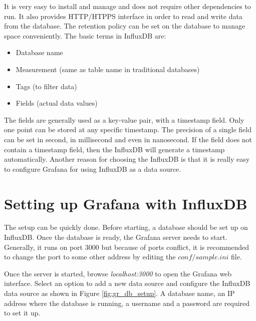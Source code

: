 It is very easy to install and manage and does not require other dependencies to run. It also provides HTTP/HTPPS interface in order to read and write data from the database. The retention policy can be set on the database to manage space conveniently. The basic terms in InfluxDB are:

\begin{itemize}
	\item Database name
	\item Measurement (same as table name in traditional databases)
	\item Tags (to filter data)
	\item Fields (actual data values)
\end{itemize}

The fields are generally used as a key-value pair, with a timestamp field. Only one point can be stored at any specific timestamp. The precision of a single field can be set in second, in millisecond and even in nanosecond. If the field does not contain a timestamp field, then the InfluxDB will generate a timestamp automatically. Another reason for choosing the InfluxDB is that it is really easy to configure Grafana for using InfluxDB as a data source. 


\section{Setting up Grafana with InfluxDB}
The setup can be quickly done. Before starting, a database should be set up on InfluxDB. Once the database is ready, the Grafana server needs to start. Generally, it runs on port 3000 but because of ports conflict, it is recommended to change the port to some other address by editing the \textit{$conf/sample.ini$} file.


Once the server is started, browse \textit{localhost:3000} to open the Grafana web interface. Select an option to add a new data source and configure the InfluxDB data source as shown in Figure \ref{fig:gr_db_setup}. A database name, an IP address where the database is running, a username and a password are required to set it up.

